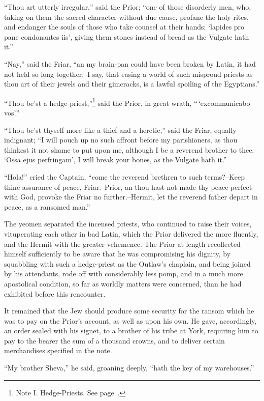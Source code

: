``Thou art utterly irregular,'' said the Prior; ``one of those
disorderly men, who, taking on them the sacred character without due
cause, profane the holy rites, and endanger the souls of those who take
counsel at their hands; `lapides pro pane condonantes iis', giving them
stones instead of bread as the Vulgate hath it.''

``Nay,'' said the Friar, ``an my brain-pan could have been broken by
Latin, it had not held so long together.--I say, that easing a world of
such misproud priests as thou art of their jewels and their gimcracks,
is a lawful spoiling of the Egyptians.''

``Thou be'st a hedge-priest,''\footnote{Note I. Hedge-Priests. See
page~\pageref{noteCXXXIII}.} said the Prior, in great wrath,
``\,`excommunicabo vos'.''

``Thou be'st thyself more like a thief and a heretic,'' said the Friar,
equally indignant; ``I will pouch up no such affront before my
parishioners, as thou thinkest it not shame to put upon me, although I
be a reverend brother to thee. `Ossa ejus perfringam', I will break your
bones, as the Vulgate hath it.''

``Hola!'' cried the Captain, ``come the reverend brethren to such
terms?--Keep thine assurance of peace, Friar.--Prior, an thou hast not
made thy peace perfect with God, provoke the Friar no further.--Hermit,
let the reverend father depart in peace, as a ransomed man.''

The yeomen separated the incensed priests, who continued to raise their
voices, vituperating each other in bad Latin, which the Prior delivered
the more fluently, and the Hermit with the greater vehemence. The Prior
at length recollected himself sufficiently to be aware that he was
compromising his dignity, by squabbling with such a hedge-priest as the
Outlaw's chaplain, and being joined by his attendants, rode off with
considerably less pomp, and in a much more apostolical condition, so far
as worldly matters were concerned, than he had exhibited before this
rencounter.

It remained that the Jew should produce some security for the ransom
which he was to pay on the Prior's account, as well as upon his own. He
gave, accordingly, an order sealed with his signet, to a brother of his
tribe at York, requiring him to pay to the bearer the sum of a thousand
crowns, and to deliver certain merchandises specified in the note.

``My brother Sheva,'' he said, groaning deeply, ``hath the key of my
warehouses.''

